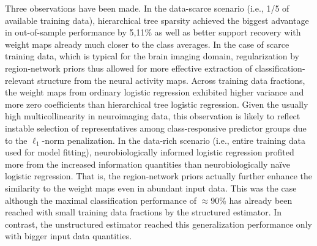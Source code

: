 \documentclass{article} %
\begin{document}
Three observations have been made.
In the data-scarce scenario (i.e., 1/5 of available training data),
hierarchical tree sparsity achieved the biggest advantage
in out-of-sample performance by 5,11\% as well as
better support recovery with weight maps already much closer
to the class averages.
In the case of scarce training data, which is typical for the brain imaging domain,
regularization by region-network priors thus allowed for
more effective extraction of classification-relevant structure
from the neural activity maps.
%
Across training data fractions,
the weight maps from ordinary logistic regression exhibited
higher variance and more zero coefficients
than hierarchical tree logistic regression.
Given the usually high multicollinearity in neuroimaging data,
this observation is likely to reflect instable selection of
representatives among class-responsive predictor groups
due to the $\ell_1$-norm penalization.
%
In the data-rich scenario (i.e., entire training data used for model fitting),
neurobiologically informed logistic regression
profited more from the increased information quantities than
neurobiologically na\"ive logistic regression.
That is, the region-network priors actually further enhance the similarity
to the weight maps even in abundant input data.
This was the case although
the maximal classification performance of $\approx$90\% has already
been reached with small training data fractions by the structured estimator.
In contrast, 
the unstructured estimator reached this generalization performance
only with bigger input data quantities.
\end{document}
